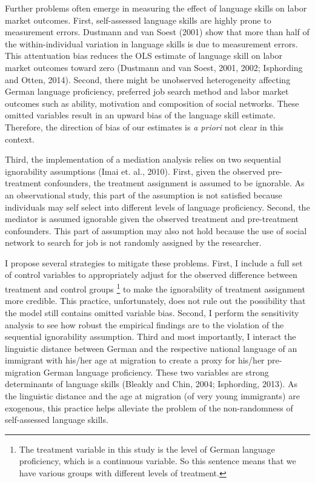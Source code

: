 \documentclass[12pt,a4paper]{article}
\begin{document}
Further problems often emerge in measuring the effect of language skills on labor market outcomes. First, self-assessed language skills are highly prone to measurement errors. Dustmann and van Soest (2001) show that more than half of the within-individual variation in language skills is due to measurement errors. This attentuation bias reduces the OLS estimate of language skill on labor market outcomes toward zero (Dustmann and van Soest, 2001, 2002; Isphording and Otten, 2014). Second, there might be unobserved heterogeneity affecting German language proficiency, preferred job search method and labor market outcomes such as ability, motivation and composition of social networks. These omitted variables result in an upward bias of the language skill estimate. Therefore, the direction of bias of our estimates is \textit{a priori} not clear in this context.

Third, the implementation of a mediation analysis relies on two sequential ignorability assumptions (Imai et. al., 2010). First, given the observed pre-treatment confounders, the treatment assignment is assumed to be ignorable. As an observational study, this part of the assumption is not satisfied because individuals may self select into different levels of language proficiency. Second, the mediator is assumed ignorable given the observed treatment and pre-treatment confounders. This part of assumption may also not hold because the use of social network to search for job is not randomly assigned by the researcher.

I propose several strategies to mitigate these problems. First, I include a full set of control variables to appropriately adjust for the observed difference between treatment and control groups \footnote{The treatment variable in this study is the level of German language proficiency, which is a continuous variable. So this sentence means that we have various groups with different levels of treatment.} to make the ignorability of treatment assignment more credible. This practice, unfortunately, does not rule out the possibility that the model still contains omitted variable bias. Second, I perform the sensitivity analysis to see how robust the empirical findings are to the violation of the sequential ignorability assumption. Third and most importantly, I interact the linguistic distance between German and the respective national language of an immigrant with his/her age at migration to create a proxy for his/her pre-migration German language proficiency. These two variables are strong determinants of language skills (Bleakly and Chin, 2004; Isphording, 2013). As the linguistic distance and the age at migration (of very young immigrants) are exogenous, this practice helps alleviate the problem of the non-randomness of self-assessed language skills.
\end{document}
